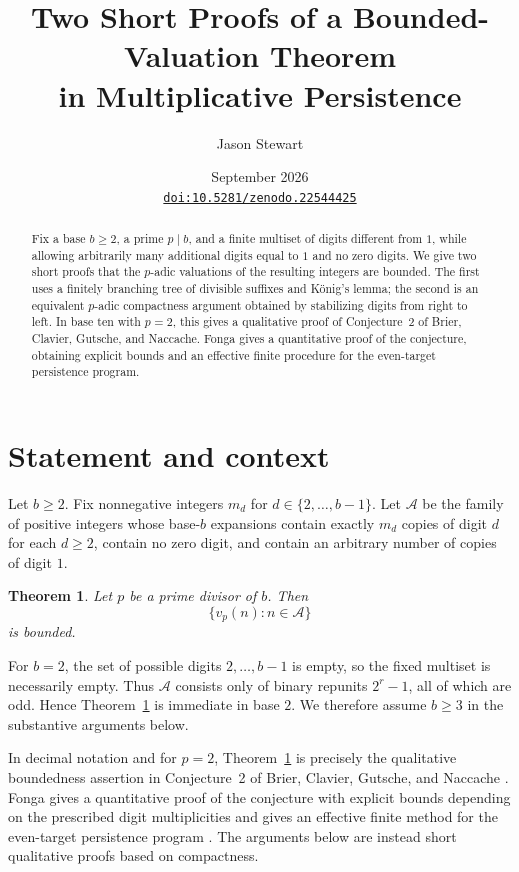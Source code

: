\documentclass[11pt]{article}
\title{Two Short Proofs of a Bounded-Valuation Theorem\\
in Multiplicative Persistence}
\author{Jason Stewart}
\date{September 2026\\[0.5em]
\normalsize\href{https://doi.org/10.5281/zenodo.22544425}{\texttt{doi:10.5281/zenodo.22544425}}}
\newtheorem{theorem}{Theorem}
\begin{document}
\maketitle

\begin{abstract}
Fix a base $b\ge2$, a prime $p\mid b$, and a finite multiset of digits different
from $1$, while allowing arbitrarily many additional digits equal to $1$ and no
zero digits. We give two short proofs that the $p$-adic valuations of the
resulting integers are bounded. The first uses a finitely branching tree of
divisible suffixes and K\"onig's lemma; the second is an equivalent
$p$-adic compactness argument obtained by stabilizing digits from right to left.
In base ten with $p=2$, this gives a qualitative proof of Conjecture~2 of
Brier, Clavier, Gutsche, and Naccache. Fonga gives a quantitative proof of the conjecture,
obtaining explicit bounds and an effective finite procedure for
the even-target persistence program.
\end{abstract}

\section{Statement and context}

Let $b\ge2$. Fix nonnegative integers $m_d$ for
$d\in\{2,\dots,b-1\}$. Let $\mathcal A$ be the family of positive integers whose
base-$b$ expansions contain exactly $m_d$ copies of digit $d$ for each $d\ge2$,
contain no zero digit, and contain an arbitrary number of copies of digit $1$.

\begin{theorem}\label{thm:main}
Let $p$ be a prime divisor of $b$. Then
\[
\{v_p(n):n\in\mathcal A\}
\]
is bounded.
\end{theorem}

For $b=2$, the set of possible digits $2,\dots,b-1$ is empty, so the fixed
multiset is necessarily empty. Thus $\mathcal A$ consists only of binary
repunits $2^r-1$, all of which are odd. Hence Theorem~\ref{thm:main} is immediate
in base $2$. We therefore assume $b\ge3$ in the substantive arguments below.

In decimal notation and for $p=2$, Theorem~\ref{thm:main} is precisely the
qualitative boundedness assertion in Conjecture~2 of Brier, Clavier, Gutsche,
and Naccache \cite{BCGN}. Fonga gives a quantitative proof of the conjecture with
explicit bounds depending on the prescribed digit multiplicities and gives an
effective finite method for the even-target persistence program \cite{Fonga}.
The arguments below are instead short qualitative proofs based on compactness.
\end{document}
